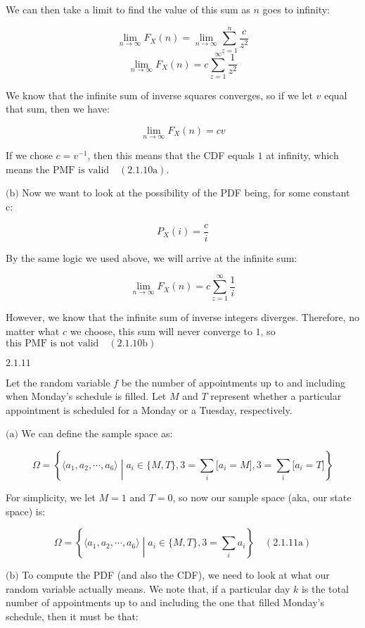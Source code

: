 \documentclass{article}
\newcommand{\problem}[2]{$\boxed{\text{#1.#2}}$}
\newcommand{\subproblem}[3]{$\boxed{\text{(#3)}}$}
\newcommand{\subsolution}[4]{\boxed{#4\quad(\text{#1.#2#3})}}
\begin{document}
We can then take a limit to find the value of this sum as $n$ goes to
infinity:

\[
\lim\limits_{n\rightarrow\infty}F_X(n)=\lim\limits_{n\rightarrow\infty}\sum\limits_{z=1}^n\frac{c}{z^2}
\] \[
\lim\limits_{n\rightarrow\infty}F_X(n)=c\sum\limits_{z=1}^\infty\frac{1}{z^2}
\]

We know that the infinite sum of inverse squares converges, so if we
let $v$ equal that sum, then we have:

\[
\lim\limits_{n\rightarrow\infty}F_X(n)=cv
\]

If we chose $c=v^{-1}$, then this means that the CDF equals $1$ at
infinity, which means
$\subsolution{2.1}{10}{a}{\text{the PMF is valid}}$.

%
\subproblem{2.1}{10}{b} Now we want to look at the possibility of the
PDF being, for some constant c:

\[
P_X(i)=\frac{c}{i}
\]

By the same logic we used above, we will arrive at the infinite sum:

\[
\lim\limits_{n\rightarrow\infty}F_X(n)=c\sum\limits_{z=1}^\infty \frac{1}{i}
\]

However, we know that the infinite sum of inverse integers
diverges. Therefore, no matter what $c$ we choose, this sum will never
converge to $1$, so $\subsolution{2.1}{10}{b}{\text{this PMF is not valid}}$

%
\problem{2.1}{11}

Let the random variable $f$ be the number of appointments up to and
including when Monday's schedule is filled. Let $M$ and $T$ represent
whether a particular appointment is scheduled for a Monday or a
Tuesday, respectively.

\subproblem{2.1}{11}{a} We can define the sample space as:

\[
\Omega=\left\{\langle a_1,a_2,\cdots,a_6\rangle\middle| a_i\in\{M,T\}, 3=\sum\limits_i\lbrack a_i=M\rbrack, 3=\sum\limits_i\lbrack a_i=T\rbrack\right\}
\]

For simplicity, we let $M=1$ and $T=0$, so now our sample space (aka,
our state space) is:

\[
\subsolution{2.1}{11}{a}{\Omega=\left\{\langle a_1,a_2,\cdots,a_6\rangle\middle| a_i\in\{M,T\},3=\sum\limits_ia_i\right\}}
\]

\subproblem{2.1}{11}{b} To compute the PDF (and also the CDF), we need
to look at what our random variable actually means. We note that, if a
particular day $k$ is the total number of appointments up to and
including the one that filled Monday's schedule, then it must be that:
\end{document}
